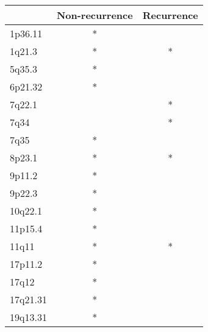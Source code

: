 \begin{tabular}{lcc}
\toprule
{} & Non-recurrence & Recurrence \\
\midrule
1p36.11  &              * &            \\
1q21.3   &              * &          * \\
5q35.3   &              * &            \\
6p21.32  &              * &            \\
7q22.1   &                &          * \\
7q34     &                &          * \\
7q35     &              * &            \\
8p23.1   &              * &          * \\
9p11.2   &              * &            \\
9p22.3   &              * &            \\
10q22.1  &              * &            \\
11p15.4  &              * &            \\
11q11    &              * &          * \\
17p11.2  &              * &            \\
17q12    &              * &            \\
17q21.31 &              * &            \\
19q13.31 &              * &            \\
\bottomrule
\end{tabular}
